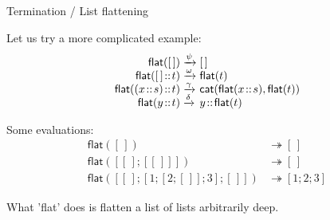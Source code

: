 \documentclass[compress,dvipdfmx]{beamer}
\newcommand\fun[1]{\textsf{#1}}
\newcommand\el{[\,]}
\newcommand\cons[2]{{#1}\!::\!{#2}}
\begin{document}
%
\begin{frame}{Termination / List flattening}

   Let us try a more complicated example:
   \begin{equation*}
     \begin{array}{r@{\;}l@{\;}l}
       \fun{flat}(\el)                   & \xrightarrow{\psi}
       & \el\\
       \fun{flat}(\cons{\el}{t})         & \xrightarrow{\smash{\omega}}
       & \fun{flat}(t)\\
       \fun{flat}(\cons{(\cons{x}{s})}{t}) & \xrightarrow{\smash{\gamma}}
       & \fun{cat}(\fun{flat}(\cons{x}{s}),\fun{flat}(t))\\
       \fun{flat}(\cons{y}{t})           & \xrightarrow{\smash{\delta}}
       & \cons{y}{\fun{flat}(t)}
     \end{array}
   \end{equation*}

   Some evaluations:
   \begin{align*}
     \fun{flat}(\el) & \twoheadrightarrow \el\\
     \fun{flat}([\el;[\el]]) & \twoheadrightarrow \el\\
     \fun{flat}([\el;[1;[2;\el];3];\el]) & \twoheadrightarrow [1;2;3]
   \end{align*}

   What '\fun{flat}' does is flatten a list of lists arbitrarily
   deep.

\end{frame}
\end{document}
